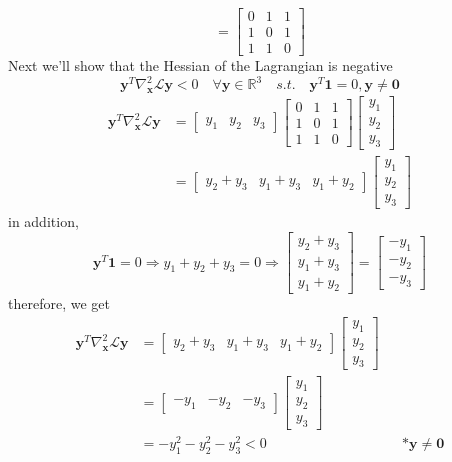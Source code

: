 \documentclass{article}
\begin{document}
\begin{enumerate}[(a)]
\[ = 
 \begin{bmatrix} 
 0& 1 & 1 \\
  1& 0 & 1 \\
   1& 1 & 0 
 \end{bmatrix}
 \]
Next we'll show that the Hessian of the Lagrangian is negative
\[\mathbf{y}^T\nabla_{\mathbf{x}}^2\mathcal{L}\mathbf{y} <0 \quad \forall \mathbf{y}\in \mathbb{R}^3 \quad s.t. \quad \mathbf{y}^T\mathbf{1} = 0 , \mathbf{y}\ne \mathbf{0} \]
\begin{align*}
\mathbf{y}^T\nabla_{\mathbf{x}}^2\mathcal{L}\mathbf{y} &= 
 \begin{bmatrix} 
 y_1& y_2 & y_3 
 \end{bmatrix}
 \begin{bmatrix} 
  0& 1 & 1 \\
   1& 0 & 1 \\
    1& 1 & 0 
  \end{bmatrix}
   \begin{bmatrix} 
   y_1\\ y_2 \\ y_3 
   \end{bmatrix} \\ 
   &=
\begin{bmatrix} 
 y_2+y_3& y_1+y_3 & y_1+y_2 
 \end{bmatrix}
\begin{bmatrix} 
   y_1\\ y_2 \\ y_3 
   \end{bmatrix} 
\end{align*}
in addition,
\[\mathbf{y}^T\mathbf{1} = 0 \Rightarrow y_1+y_2+y_3 = 0 \Rightarrow 
\begin{bmatrix} 
 y_2+y_3\\ y_1+y_3 \\ y_1+y_2 
 \end{bmatrix}
 =
 \begin{bmatrix} 
    -y_1\\ -y_2 \\ -y_3 
    \end{bmatrix} 
\]
therefore, we get
\begin{align*}
\mathbf{y}^T\nabla_{\mathbf{x}}^2\mathcal{L}\mathbf{y}
&=
\begin{bmatrix}
 y_2+y_3& y_1+y_3 & y_1+y_2
 \end{bmatrix}
\begin{bmatrix}
   y_1\\ y_2 \\ y_3
   \end{bmatrix} \\
&=
\begin{bmatrix}
 -y_1& -y_2 & -y_3
 \end{bmatrix}
\begin{bmatrix}
   y_1\\ y_2 \\ y_3
   \end{bmatrix} \\
   &= -y_1^2 -y_2^2 -y_3^2 < 0 && *\mathbf{y}\ne \mathbf{0}
\end{align*}
\end{enumerate}
\end{document}
